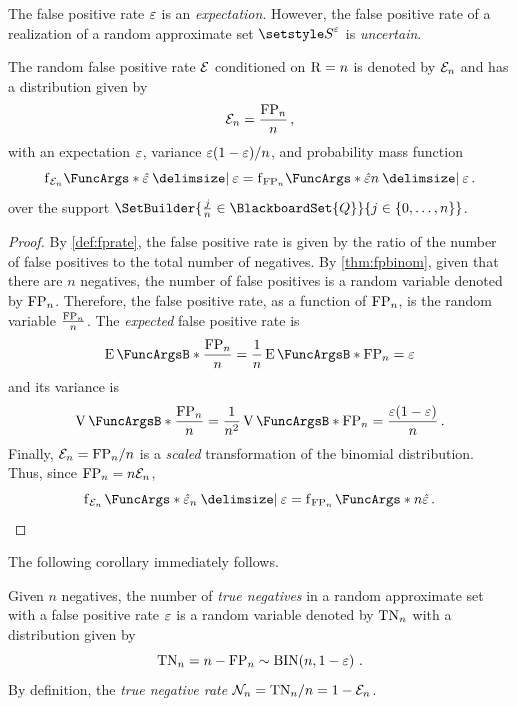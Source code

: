 \documentclass[10pt,final,hidelinks]{article}
\numberwithin{equation}{section}
\begin{document}
The false positive rate $\varepsilon$ is an \emph{expectation}.
However, the false positive rate of a realization of a random approximate set $\ASet{S}[\fprate]$ is \emph{uncertain}.
\begin{theorem}
\label{thm:fpr}
The random false positive rate $\mathcal{E}$ conditioned on $\mathrm{R} = n$ is denoted by $\mathcal{E}_n$ and has a distribution given by
\begin{equation}
    \mathcal{E}_n = \frac{\mathrm{FP}_n}{n}\,,
\end{equation}
with an expectation $\varepsilon$, variance $\varepsilon(1-\varepsilon) / n$, and probability mass function
\begin{equation}
	\Pdf_{\FPR_n}\!\FuncArgs*{\fprateob \Given \fprate} = \Pdf_{\FP_n}\!\FuncArgs*{\fprateob n \Given \fprate}\,.
\end{equation}
over the support $\SetBuilder{ \frac{j}{n} \in \BlackboardSet{Q}}{j \in \{0,\ldots,n\}}$.
\end{theorem}
\begin{proof}
By \cref{def:fprate}, the false positive rate is given by the ratio of the number of false positives to the total number of negatives.
By \cref{thm:fpbinom}, given that there are $n$ negatives, the number of false positives is a random variable denoted by $\mathrm{FP}_n$.
Therefore, the false positive rate, as a function of $\mathrm{FP}_n$, is the random variable $\frac{\mathrm{FP}_n}{n}$.
The \emph{expected} false positive rate is
\begin{equation}
    \Expect{\frac{\FP_n}{n}} = \frac{1}{n}\Expect{\FP_n} = \fprate
\end{equation}
and its variance is
\begin{equation}
    \Var{\frac{\FP_n}{n}} = \frac{1}{n^2}\Var{\FP_n} = \frac{\fprate(1-\fprate)}{n}\,.
\end{equation}
Finally, $\mathcal{E}_n = \mathrm{FP}_n / n$ is a \emph{scaled} transformation of the binomial distribution.
Thus, since $\mathrm{FP}_n = n \mathcal{E}_n$,
\begin{equation}
	\PDF{\fprateob_n \Given \fprate}[\FPR_n] = \PDF{n \fprateob}[\FP_n]\,.
\end{equation}
\end{proof}
The following corollary immediately follows.
\begin{corollary}
	\label{cor:tnbinom}
	Given $n$ negatives, the number of \emph{true negatives} in a random approximate set with a false positive rate $\varepsilon$ is a random variable denoted by $\mathrm{TN}_n$ with a distribution given by
	\begin{equation}
	\mathrm{TN}_n = n - \mathrm{FP}_n \sim \mathrm{BIN}\!\left(n, 1-\varepsilon\right)\,.
	\end{equation}
	By definition, the \emph{true negative rate} $\mathcal{N}_n = \mathrm{TN}_n / n = 1 - \mathcal{E}_n$.
\end{corollary}
\end{document}
